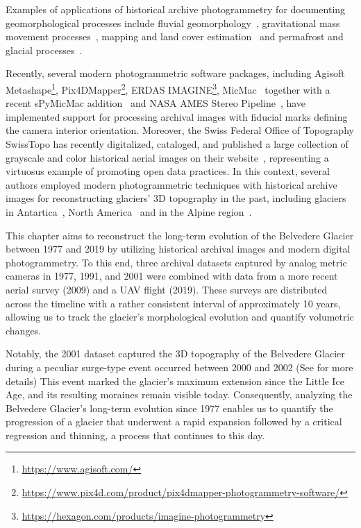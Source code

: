 Examples of applications of historical archive photogrammetry for documenting geomorphological processes include fluvial geomorphology~\citep{Bakker2017, lane2010quantification}, gravitational mass movement processes~\citep{chandler1995steady, walstra2007historical, schwab2008landsliding}, mapping and land cover estimation~\citep{Giordano2018} and permafrost and glacial processes~\citep{kaab2002monitoring, Kaufmann2003, keutterling2006monitoring, mondino2008multi, Fischer2011}.

Recently, several modern photogrammetric software packages, including Agisoft Metashape\footnote{\url{https://www.agisoft.com/}}, Pix4DMapper\footnote{\url{https://www.pix4d.com/product/pix4dmapper-photogrammetry-software/}}, ERDAS IMAGINE\footnote{\url{https://hexagon.com/products/imagine-photogrammetry}}, MicMac~\citep{rupnik2017micmac, Zhang2021} together with a recent sPyMicMac addition~\citep{McNabb2020} and NASA AMES Stereo Pipeline~\citep{Beyer2018}, have implemented support for processing archival images with fiducial marks defining the camera interior orientation. 
Moreover, the Swiss Federal Office of Topography SwissTopo has recently digitalized, cataloged, and published a large collection of grayscale and color historical aerial images on their website~\citep{Heisig2021}, representing a virtuosus example of promoting open data practices.
In this context, several authors employed modern photogrammetric techniques with historical archive images for reconstructing glaciers' 3D topography in the past, including glaciers in Antartica~\citep{Child2021, Dahle2024}, North America~\citep{Knuth2023} and in the Alpine region~\citep{Molg2017, poli2020use}.

This chapter aims to reconstruct the long-term evolution of the Belvedere Glacier between 1977 and 2019 by utilizing historical archival images and modern digital photogrammetry.
To this end, three archival datasets captured by analog metric cameras in 1977, 1991, and 2001 were combined with data from a more recent aerial survey (2009) and a UAV flight (2019).
These surveys are distributed across the timeline with a rather consistent interval of approximately 10 years, allowing us to track the glacier's morphological evolution and quantify volumetric changes. 

Notably, the 2001 dataset captured the 3D topography of the Belvedere Glacier during a peculiar surge-type event \citep{Haeberli2002} occurred between 2000 and 2002 (See  for more  details)
This event marked the glacier's maximum extension since the Little Ice Age, and its resulting moraines remain visible today.
Consequently, analyzing the Belvedere Glacier's long-term evolution since 1977 enables us to quantify the progression of a glacier that underwent a rapid expansion followed by a critical regression and thinning, a process that continues to this day.

